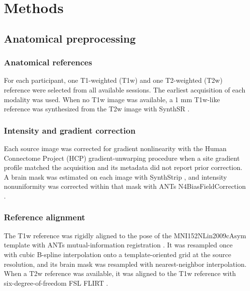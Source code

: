 
\section*{Methods}

\subsection*{Anatomical preprocessing}

\subsubsection*{Anatomical references}

For each participant, one T1-weighted (T1w) and one T2-weighted (T2w) reference were selected from all available sessions. The earliest acquisition of each modality was used. When no T1w image was available, a 1 mm T1w-like reference was synthesized from the T2w image with SynthSR \citep{iglesias2023synthsr}.

\subsubsection*{Intensity and gradient correction}

Each source image was corrected for gradient nonlinearity with the Human Connectome Project (HCP) gradient-unwarping procedure \citep{glasser2013minimal} when a site gradient profile matched the acquisition and its metadata did not report prior correction. A brain mask was estimated on each image with SynthStrip \citep{hoopes2022synthstrip}, and intensity nonuniformity was corrected within that mask with ANTs N4BiasFieldCorrection \citep{tustison2010n4itk}.

\subsubsection*{Reference alignment}

The T1w reference was rigidly aligned to the pose of the MNI152NLin2009cAsym template \citep{fonov2011mni} with ANTs mutual-information registration \citep{avants2011ants}. It was resampled once with cubic B-spline interpolation onto a template-oriented grid at the source resolution, and its brain mask was resampled with nearest-neighbor interpolation. When a T2w reference was available, it was aligned to the T1w reference with six-degree-of-freedom FSL FLIRT \citep{jenkinson2001flirt}.

